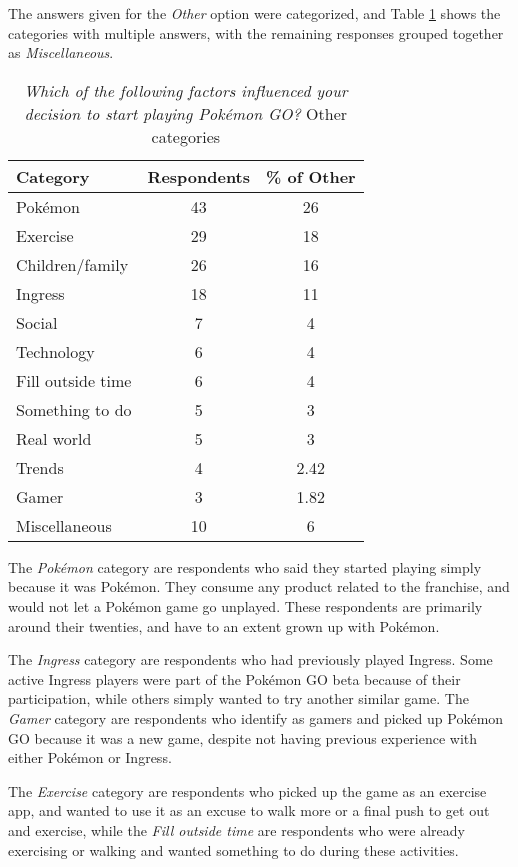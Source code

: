 The answers given for the \emph{Other} option were categorized, and Table \ref{tbl:initial-interest-other-categories} shows the categories with multiple answers, with the remaining responses grouped together as \emph{Miscellaneous}.

\begin{table}[h]
	\caption{\emph{Which of the following factors influenced your decision to start playing Pokémon GO?} Other categories}
	\centering
	\label{tbl:initial-interest-other-categories}
	\begin{tabular}{|l|c|c|}
		\hline
		\textbf{Category} & \textbf{Respondents} & \textbf{\% of Other}\\
		\hline\hline
		Pokémon & 43 & 26\\\hline
		Exercise & 29 & 18\\\hline
		Children/family & 26 & 16\\\hline
		Ingress & 18 & 11\\\hline
		Social & 7 & 4\\\hline
		Technology & 6 & 4\\\hline
		Fill outside time & 6 & 4\\\hline
		Something to do & 5 & 3\\\hline
		Real world & 5 & 3\\\hline
		Trends & 4 & 2.42\\\hline
		Gamer & 3 & 1.82\\\hline
		Miscellaneous & 10 & 6\\\hline
	\end{tabular}
\end{table}

The \emph{Pokémon} category are respondents who said they started playing simply because it was Pokémon. They consume any product related to the franchise, and would not let a Pokémon game go unplayed. These respondents are primarily around their twenties, and have to an extent grown up with Pokémon.

The \emph{Ingress} category are respondents who had previously played Ingress. Some active Ingress players were part of the Pokémon GO beta because of their participation, while others simply wanted to try another similar game. The \emph{Gamer} category are respondents who identify as gamers and picked up Pokémon GO because it was a new game, despite not having previous experience with either Pokémon or Ingress.

The \emph{Exercise} category are respondents who picked up the game as an exercise app, and wanted to use it as an excuse to walk more or a final push to get out and exercise, while the \emph{Fill outside time} are respondents who were already exercising or walking and wanted something to do during these activities.

